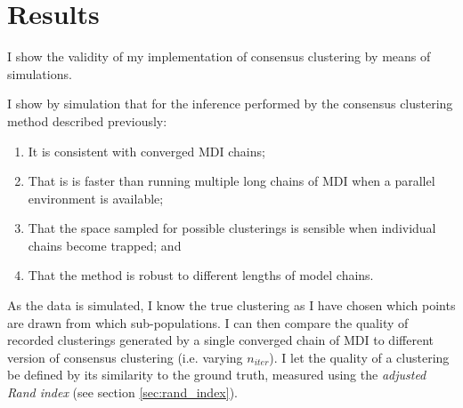 \documentclass[14pt]{extarticle} %
\begin{document}
	

	
	\section{Results}
	I show the validity of my implementation of consensus clustering by means of simulations. 
	
	I show by simulation that for the inference performed by the consensus clustering method described previously:
	\begin{enumerate}
		\item It is consistent with converged MDI chains;
		\item That is is faster than running multiple long chains of MDI when a parallel environment is available;
		\item That the space sampled for possible clusterings is sensible when individual chains become trapped; and
		\item That the method is robust to different lengths of model chains.
	\end{enumerate}
	As the data is simulated, I know the true clustering as I have chosen which points are drawn from which sub-populations. I can then compare the quality of recorded clusterings generated by a single converged chain of MDI to different version of consensus clustering (i.e. varying $n_{iter}$). I let the quality of a clustering be defined by its similarity to the ground truth, measured using the \emph{adjusted Rand index} (see section \ref{sec:rand_index}).
	
\end{document}
